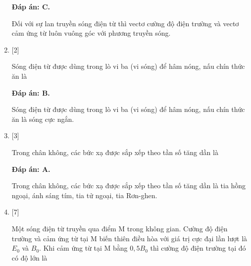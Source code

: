\begin{enumerate}[label=\bfseries Câu \arabic*:]
	\hideall
	{		\textbf{Đáp án: C.}
		
		Đối với sự lan truyền sóng điện từ thì vectơ cường độ điện trường và vectơ cảm ứng từ luôn vuông góc với phương truyền sóng.
		
	}
	
	\item {} [2] %
	
	{Sóng điện từ được dùng trong lò vi ba (vi sóng) để hâm nóng, nấu chín thức ăn là
	}
	
	\hideall
	{		\textbf{Đáp án: B.}
		
		Sóng điện từ được dùng trong lò vi ba (vi sóng) để hâm nóng, nấu chín thức ăn là sóng cực ngắn.
		
	}
	
	\item {} [3] %
	
	{Trong chân không, các bức xạ được sắp xếp theo tần số tăng dần là
	}
	
	\hideall
	{		\textbf{Đáp án: A.}
		
		Trong chân không, các bức xạ được sắp xếp theo tần số tăng dần là tia hồng ngoại, ánh sáng tím, tia tử ngoại, tia Rơn-ghen.
		
	}
	
	\item {} [7] %
	
	{Một sóng điện từ truyền qua điểm M trong không gian. Cường độ điện trường và cảm ứng từ tại M biến thiên điều hòa với giá trị cực đại lần lượt là $E_0$ và $B_0$. Khi cảm ứng từ tại M bằng $ 0,5B_0$ thì cường độ điện trường tại đó có độ lớn là
	}
	

\end{enumerate}

